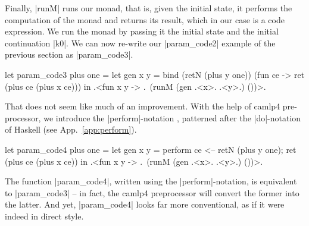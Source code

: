 \documentclass{elsart}
\begin{document}
Finally, |runM| runs our monad, that is, given the initial state,
it performs the computation of
the monad and returns its result, which in our case is a code
expression. We run the monad by passing it the initial state and the
initial continuation |k0|. We can now re-write our |param_code2|
example of the previous section as |param_code3|.
\begin{code}
let param_code3 plus one =
  let gen x y = bind (retN (plus y one)) (fun ce -> 
                ret (plus ce (plus x ce)))
  in .<fun x y -> .~(runM (gen .<x>. .<y>.) ())>.
\end{code}
%
That does not seem like much of an improvement. With the help of
camlp4 pre-processor, we introduce the |perform|-notation \cite{metamonadsURL},
patterned after the |do|-notation of Haskell (see App.~\ref{app:perform}).
\begin{code}
let param_code4 plus one =
  let gen x y = perform ce <-- retN (plus y one);
                        ret (plus ce (plus x ce))
  in .<fun x y -> .~(runM (gen .<x>. .<y>.) ())>.
\end{code}
The function
|param_code4|, written using the |perform|-notation, is equivalent to
|param_code3| -- in fact, the camlp4 preprocessor will convert the
former into the latter. And yet, |param_code4| looks far more
conventional, as if it were indeed in direct style.
\end{document}
